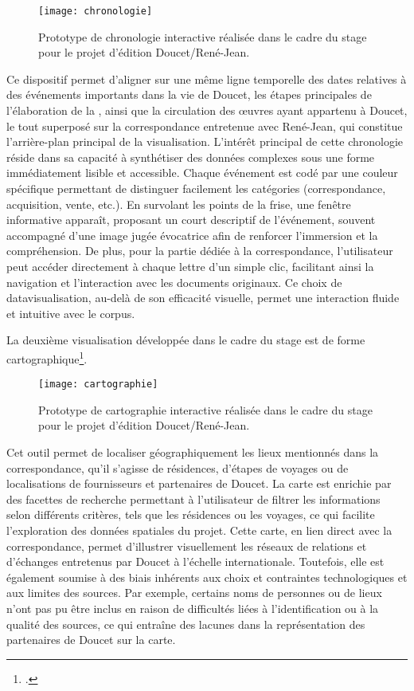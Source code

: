 \begin{figure}[h] 
\centering 
\texttt{[image: chronologie]} 
\caption{Prototype de chronologie interactive réalisée dans le cadre du stage pour le projet d’édition Doucet/René-Jean.} 
\label{fig:prototype-chrono} 
\end{figure}

Ce dispositif permet d'aligner sur une même ligne temporelle des dates relatives à des événements importants dans la vie de Doucet, les étapes principales de l'élaboration de la \baa, ainsi que la circulation des œuvres ayant appartenu à Doucet, le tout superposé sur la correspondance entretenue avec René-Jean, qui constitue l’arrière-plan principal de la visualisation. L’intérêt principal de cette chronologie réside dans sa capacité à synthétiser des données complexes sous une forme immédiatement lisible et accessible. Chaque événement est codé par une couleur spécifique permettant de distinguer facilement les catégories (correspondance, acquisition, vente, etc.). En survolant les points de la frise, une fenêtre informative apparaît, proposant un court descriptif de l’événement, souvent accompagné d'une image jugée évocatrice afin de renforcer l’immersion et la compréhension. De plus, pour la partie dédiée à la correspondance, l’utilisateur peut accéder directement à chaque lettre d’un simple clic, facilitant ainsi la navigation et l’interaction avec les documents originaux. Ce choix de datavisualisation, au-delà de son efficacité visuelle, permet une interaction fluide et intuitive avec le corpus.

La deuxième visualisation développée dans le cadre du stage est de forme cartographique\footcite{noauthor_carte_nodate}.

\begin{figure}[h] 
\centering 
\texttt{[image: cartographie]} 
\caption{Prototype de cartographie interactive réalisée dans le cadre du stage pour le projet d’édition Doucet/René-Jean.} 
\label{fig:prototype-carto} 
\end{figure}

Cet outil permet de localiser géographiquement les lieux mentionnés dans la correspondance, qu’il s’agisse de résidences, d’étapes de voyages ou de localisations de fournisseurs et partenaires de Doucet. La carte est enrichie par des facettes de recherche permettant à l’utilisateur de filtrer les informations selon différents critères, tels que les résidences ou les voyages, ce qui facilite l'exploration des données spatiales du projet. 
Cette carte, en lien direct avec la correspondance, permet d’illustrer visuellement les réseaux de relations et d’échanges entretenus par Doucet à l’échelle internationale. Toutefois, elle est également soumise à des biais inhérents aux choix et contraintes technologiques et aux limites des sources. Par exemple, certains noms de personnes ou de lieux n’ont pas pu être inclus en raison de difficultés liées à l’identification ou à la qualité des sources, ce qui entraîne des lacunes dans la représentation des partenaires de Doucet sur la carte.

